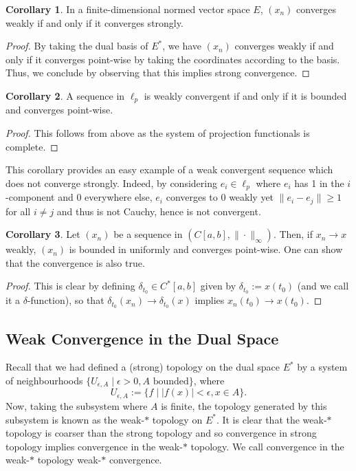 \documentclass[]{article}
\theoremstyle{definition}
\newtheorem{corollary}{Corollary}[theorem]
\theoremstyle{definition}
\begin{document}
\begin{corollary}
  In a finite-dimensional normed vector space \(E\), \((x_n)\) converges weakly 
  if and only if it converges strongly.
\end{corollary}
\begin{proof}
  By taking the dual basis of \(E^*\), we have \((x_n)\) converges weakly if and only 
  if it converges point-wise by taking the coordinates according to the basis. 
  Thus, we conclude by observing that this implies strong convergence.
\end{proof}

\begin{corollary}
  A sequence in \(\ell_p\) is weakly convergent if and only if it is bounded 
  and converges point-wise.
\end{corollary}
\begin{proof}
  This follows from above as the system of projection functionals is complete.
\end{proof}

This corollary provides an easy example of a weak convergent sequence which 
does not converge strongly. Indeed, by considering \(e_i \in \ell_p\) where 
\(e_i\) has 1 in the \(i\)-component and 0 everywhere else, 
\(e_i\) converges to 0 weakly yet \(\|e_i - e_j\| \ge 1\) for all \(i \neq j\) 
and thus is not Cauchy, hence is not convergent.

\begin{corollary}
  Let \((x_n)\) be a sequence in \((C[a, b], \|\cdot\|_\infty)\). Then, 
  if \(x_n \to x\) weakly, \((x_n)\) is bounded in uniformly and converges point-wise. 
  One can show that the convergence is also true.
\end{corollary}
\begin{proof}
  This is clear by defining \(\delta_{t_0} \in C^*[a, b]\) given by 
  \(\delta_{t_0} := x(t_0)\) (and we call it a \(\delta\)-function), so that  
  \(\delta_{t_0}(x_n) \to \delta_{t_0}(x)\) implies \(x_n(t_0) \to x(t_0)\).
\end{proof}

\subsection{Weak Convergence in the Dual Space}

Recall that we had defined a (strong) topology on the dual space \(E^*\) by a 
system of neighbourhoods \(\{U_{\epsilon, A} \mid \epsilon > 0, A \text{ bounded}\}\),
where 
\[U_{\epsilon, A} := \{f \mid |f(x)| < \epsilon, x \in A\}.\]
Now, taking the subsystem where \(A\) is finite, the topology generated by 
this subsystem is known as the weak-\(*\) topology on \(E^*\). It is clear 
that the weak-\(*\) topology is coarser than the strong topology and so 
convergence in strong topology implies convergence in the weak-\(*\) topology.
We call convergence in the weak-\(*\) topology weak-\(*\) convergence.
\end{document}
